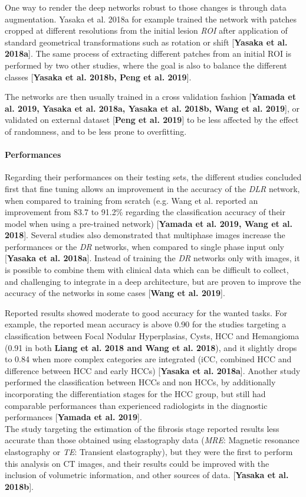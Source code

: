 \documentclass[]{article}
\let\oldparagraph\paragraph
\renewcommand{\paragraph}[1]{\oldparagraph{#1}\mbox{}}
\begin{document}
One way to render the deep networks robust to those changes is through
data augmentation. Yasaka et al. 2018a for example trained the network
with patches cropped at different resolutions from the initial lesion
\emph{ROI} after application of standard geometrical transformations
such as rotation or shift {[}\textbf{Yasaka et al. 2018a}{]}. The same
process of extracting different patches from an initial ROI is performed
by two other studies, where the goal is also to balance the different
classes {[}\textbf{Yasaka et al. 2018b, Peng et al. 2019}{]}.

The networks are then usually trained in a cross validation fashion
{[}\textbf{Yamada et al. 2019, Yasaka et al. 2018a, Yasaka et al. 2018b,
Wang et al. 2019}{]}, or validated on external dataset {[}\textbf{Peng
et al. 2019}{]} to be less affected by the effect of randomness, and to
be less prone to overfitting.

\paragraph{Performances}\label{performances}

Regarding their performances on their testing sets, the different
studies concluded first that fine tuning allows an improvement in the
accuracy of the \emph{DLR} network, when compared to training from
scratch (e.g. Wang et al. reported an improvement from 83.7 to 91.2\%
regarding the classification accuracy of their model when using a
pre-trained network) {[}\textbf{Yamada et al. 2019, Wang et al.
2018}{]}. Several studies also demonstrated that multiphase images
increase the performances or the \emph{DR} networks, when compared to
single phase input only {[}\textbf{Yasaka et al. 2018a}{]}. Instead of
training the \emph{DR} networks only with images, it is possible to
combine them with clinical data which can be difficult to collect, and
challenging to integrate in a deep architecture, but are proven to
improve the accuracy of the networks in some cases {[}\textbf{Wang et
al. 2019}{]}.

Reported results showed moderate to good accuracy for the wanted tasks.
For example, the reported mean accuracy is above 0.90 for the studies
targeting a classification between Focal Nodular Hyperplasias, Cysts,
HCC and Hemangioma (0.91 in both \textbf{Liang et al. 2018 and Wang et
al. 2018}), and it slightly drops to 0.84 when more complex categories
are integrated (iCC, combined HCC and difference between HCC and early
HCCs) {[}\textbf{Yasaka et al. 2018a}{]}. Another study performed the
classification between HCCs and non HCCs, by additionally incorporating
the differentiation stages for the HCC group, but still had comparable
performances than experienced radiologists in the diagnostic
performances {[}\textbf{Yamada et al. 2019}{]}.\\
The study targeting the estimation of the fibrosis stage reported
results less accurate than those obtained using elastography data
(\emph{MRE}: Magnetic resonance elastography or \emph{TE}: Transient
elastography), but they were the first to perform this analysis on CT
images, and their results could be improved with the inclusion of
volumetric information, and other sources of data. {[}\textbf{Yasaka et
al. 2018b}{]}.
\end{document}
